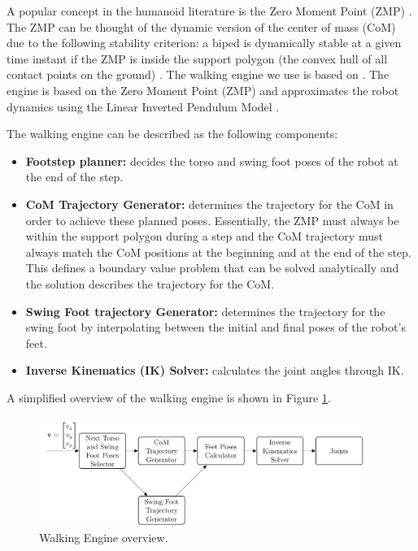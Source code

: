 A popular concept in the humanoid literature is the Zero Moment Point (ZMP) \cite{ZMP}.
The ZMP can be thought of the dynamic version of the center of mass (CoM) due to the following stability
criterion: a biped is dynamically stable at a given time instant if the ZMP is inside the support polygon
(the convex hull of all contact points on the ground) \cite{ZMP}.
The walking engine we use is based on \cite{MestradoManga, CaminhadaManga}.
The engine is based on the Zero Moment Point (ZMP)
and approximates the robot dynamics using the Linear Inverted Pendulum Model \cite{Kajita}.

The walking engine can be described as the following components:

\begin{itemize}
    \item \textbf{Footstep planner:} decides the torso and swing foot poses of the robot at the end of the step.
    \item \textbf{CoM Trajectory Generator:} determines the trajectory for the CoM in order to achieve these planned poses.
    Essentially, the ZMP must always be within the support polygon during a step and the CoM trajectory must always
    match the CoM positions at the beginning and at the end of the step. This defines a boundary value problem that can
    be solved analytically and the solution describes the trajectory for the CoM.
    \item \textbf{Swing Foot trajectory Generator:} determines the trajectory for the swing foot by interpolating between
    the initial and final poses of the robot's feet. 
    \item \textbf{Inverse Kinematics (IK) Solver:} calculates the joint angles through IK.
\end{itemize}

A simplified overview of the walking engine is shown in Figure \ref{fig:walkingengine}.

\begin{figure}[htb]
    \centering
    \includegraphics[width=0.95\textwidth]{Chapter5/walkingengine.png}
    \caption{Walking Engine overview.}
    \label{fig:walkingengine}
\end{figure}

